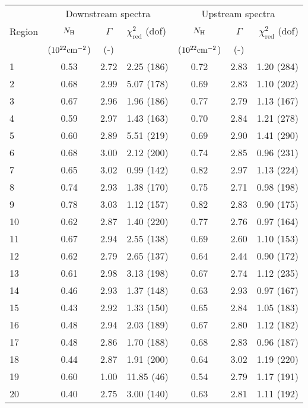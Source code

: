 \begin{tabular}{@{}lcclccr@{}}
\toprule
{} & \multicolumn{3}{c}{Downstream spectra}
   & \multicolumn{3}{c}{Upstream spectra} \\
\cmidrule(lr){2-4} \cmidrule(l){5-7}
Region & $N_{\mathrm{H}}$ & $\Gamma$ & $\chi^2_{\mathrm{red}}$ (dof)
       & $N_{\mathrm{H}}$ & $\Gamma$ & $\chi^2_{\mathrm{red}}$ (dof) \\
{} & ($10^{22} \mathrm{cm}^{-2}$) & (-) & {}
   & ($10^{22} \mathrm{cm}^{-2}$) & (-) & {} \\
\midrule
1  & 0.53 & 2.72 & 2.25 (186) & 0.72 & 2.83 & 1.20 (284) \\
2  & 0.68 & 2.99 & 5.07 (178) & 0.69 & 2.83 & 1.10 (202) \\
3  & 0.67 & 2.96 & 1.96 (186) & 0.77 & 2.79 & 1.13 (167) \\
\cmidrule{1-7}
4  & 0.59 & 2.97 & 1.43 (163) & 0.70 & 2.84 & 1.21 (278) \\
5  & 0.60 & 2.89 & 5.51 (219) & 0.69 & 2.90 & 1.41 (290) \\
6  & 0.68 & 3.00 & 2.12 (200) & 0.74 & 2.85 & 0.96 (231) \\
7  & 0.65 & 3.02 & 0.99 (142) & 0.82 & 2.97 & 1.13 (224) \\
8  & 0.74 & 2.93 & 1.38 (170) & 0.75 & 2.71 & 0.98 (198) \\
9  & 0.78 & 3.03 & 1.12 (157) & 0.82 & 2.83 & 0.90 (175) \\
10 & 0.62 & 2.87 & 1.40 (220) & 0.77 & 2.76 & 0.97 (164) \\
\cmidrule{1-7}
11 & 0.67 & 2.94 & 2.55 (138) & 0.69 & 2.60 & 1.10 (153) \\
12 & 0.62 & 2.79 & 2.65 (137) & 0.64 & 2.44 & 0.90 (172) \\
13 & 0.61 & 2.98 & 3.13 (198) & 0.67 & 2.74 & 1.12 (235) \\
\cmidrule{1-7}
14 & 0.46 & 2.93 & 1.37 (148) & 0.63 & 2.93 & 0.97 (167) \\
15 & 0.43 & 2.92 & 1.33 (150) & 0.65 & 2.84 & 1.05 (183) \\
16 & 0.48 & 2.94 & 2.03 (189) & 0.67 & 2.80 & 1.12 (182) \\
17 & 0.48 & 2.86 & 1.70 (188) & 0.68 & 2.83 & 0.96 (187) \\
\cmidrule{1-7}
18 & 0.44 & 2.87 & 1.91 (200) & 0.64 & 3.02 & 1.19 (220) \\
19 & 0.60 & 1.00 & 11.85 (46) & 0.54 & 2.79 & 1.17 (191) \\
20 & 0.40 & 2.75 & 3.00 (140) & 0.63 & 2.81 & 1.11 (192) \\
\bottomrule
\end{tabular}
